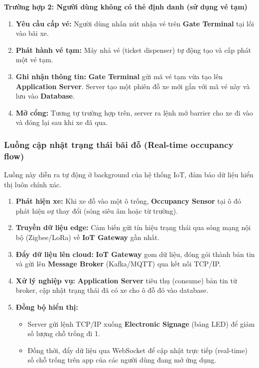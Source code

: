 \textbf{Trường hợp 2: Người dùng không có thẻ định danh (sử dụng vé tạm)}
\begin{enumerate}
    \item \textbf{Yêu cầu cấp vé:} Người dùng nhấn nút nhận vé trên \textbf{Gate Terminal} tại lối vào bãi xe.
    \item \textbf{Phát hành vé tạm:} Máy nhả vé (ticket dispenser) tự động tạo và cấp phát một vé tạm.
    \item \textbf{Ghi nhận thông tin:} \textbf{Gate Terminal} gửi mã vé tạm vừa tạo lên \textbf{Application Server}. Server tạo một phiên đỗ xe mới gắn với mã vé này và lưu vào \textbf{Database}.
    \item \textbf{Mở cổng:} Tương tự trường hợp trên, server ra lệnh mở barrier cho xe đi vào và đóng lại sau khi xe đã qua.
\end{enumerate}

\subsubsection{Luồng cập nhật trạng thái bãi đỗ (Real-time occupancy flow)}
Luồng này diễn ra tự động ở background của hệ thống IoT, đảm bảo dữ liệu hiển thị luôn chính xác.
\begin{enumerate}
    \item \textbf{Phát hiện xe:} Khi xe đỗ vào một ô trống, \textbf{Occupancy Sensor} tại ô đó phát hiện sự thay đổi (sóng siêu âm hoặc từ trường).
    \item \textbf{Truyền dữ liệu edge:} Cảm biến gửi tín hiệu trạng thái qua sóng mạng nội bộ (Zigbee/LoRa) về \textbf{IoT Gateway} gần nhất.
    \item \textbf{Đẩy dữ liệu lên cloud:} \textbf{IoT Gateway} gom dữ liệu, đóng gói thành bản tin và gửi lên \textbf{Message Broker} (Kafka/MQTT) qua kết nối TCP/IP.
    \item \textbf{Xử lý nghiệp vụ:} \textbf{Application Server} tiêu thụ (consume) bản tin từ broker, cập nhật trạng thái đã có xe cho ô đỗ đó vào database.
    \item \textbf{Đồng bộ hiển thị:}
    \begin{itemize}
        \item Server gửi lệnh TCP/IP xuống \textbf{Electronic Signage} (bảng LED) để giảm số lượng chỗ trống đi 1.
        \item Đồng thời, đẩy dữ liệu qua WebSocket để cập nhật trực tiếp (real-time) số chỗ trống trên app của các người dùng đang mở ứng dụng.
    \end{itemize}
\end{enumerate}

